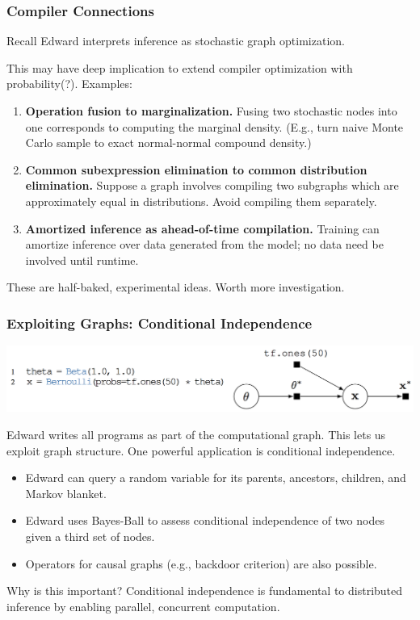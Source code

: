 \documentclass[10pt,
               xcolor={usenames,dvipsnames},
               hyperref={colorlinks,linktoc=all,citecolor=Plum,linkcolor=MidnightBlue,urlcolor=MidnightBlue},noamssymb]{beamer}
\begin{document}
\begin{frame}
\frametitle{Compiler Connections}
Recall Edward interprets inference as stochastic graph optimization.

This may have deep implication to extend compiler optimization with
probability(?).
Examples:
\begin{enumerate}
\item
\textbf{Operation fusion to marginalization.}
Fusing two stochastic nodes into one corresponds to computing the
marginal density.
(E.g., turn naive Monte Carlo sample to exact normal-normal compound density.)
\item
\textbf{Common subexpression elimination to common distribution
elimination.}
Suppose a graph involves compiling two subgraphs which
are approximately equal in distributions. Avoid compiling them
separately.
\item
\textbf{Amortized inference as ahead-of-time compilation.}
Training can amortize inference over data generated from the model; no
data need be involved until runtime.
\end{enumerate}
These are half-baked, experimental ideas. Worth more investigation.
\end{frame}

\begin{frame}
\frametitle{Exploiting Graphs: Conditional Independence}

\begin{center}
\vspace{-2ex}
\includegraphics[height=0.175\textwidth]{img/beta-bernoulli.png}
\end{center}

Edward writes all programs as part of the computational graph.
This lets us exploit graph structure.
One powerful application is conditional independence.

\begin{itemize}
\item
Edward can query a random variable for its parents,
ancestors, children, and Markov blanket.
\item
Edward uses Bayes-Ball to assess conditional independence of two
nodes given a third set of nodes.
\item
Operators for causal graphs (e.g., backdoor criterion) are also
possible.
\end{itemize}
Why is this important? Conditional independence is fundamental to
distributed inference by enabling parallel, concurrent computation.
\end{frame}
\end{document}
